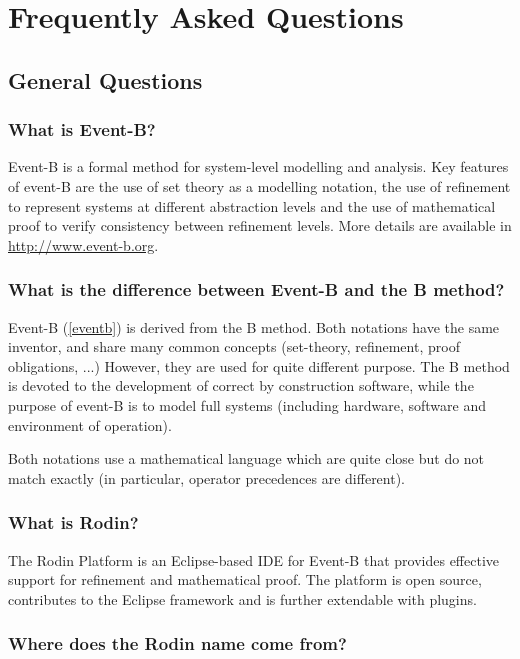 \chapter{Frequently Asked Questions}
\label{faq}

\section{General Questions}

\subsection{What is Event-B?}

Event-B is a formal method for system-level modelling and analysis. Key features of event-B are the use of set theory as a modelling notation, the use of refinement to represent systems at different abstraction levels and the use of mathematical proof to verify consistency between refinement levels.
More details are available in \url{http://www.event-b.org}.

\subsection{What is the difference between Event-B and the B method?}

Event-B (\ref{eventb}) is derived from the B method. Both notations have the same inventor, and share many common concepts (set-theory, refinement, proof obligations, ...) However, they are used for quite different purpose. The B method is devoted to the development of correct by construction software, while the purpose of event-B is to model full systems (including hardware, software and environment of operation).

Both notations use a mathematical language which are quite close but do not match exactly (in particular, operator precedences are different).

\subsection{What is Rodin?}

The Rodin Platform is an Eclipse-based IDE for Event-B that provides effective support for refinement and mathematical proof. The platform is open source, contributes to the Eclipse framework and is further extendable with plugins.

\subsection{Where does the Rodin name come from?}

